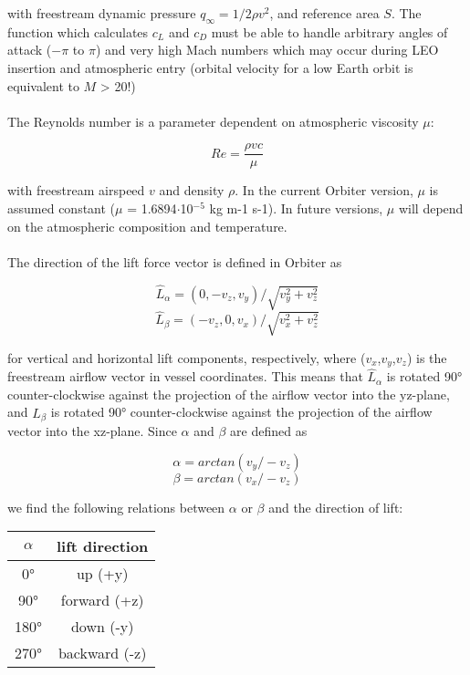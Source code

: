 \documentclass[Orbiter Developer Manual.tex]{subfiles}
\begin{document}
\noindent
with freestream dynamic pressure $q_{\infty} = 1/2\rho v^{2}$, and reference area $S$. The function which calculates $c_{L}$ and $c_{D}$ must be able to handle arbitrary angles of attack ($-\pi$ to $\pi$) and very high Mach numbers which may occur during LEO insertion and atmospheric entry (orbital velocity for a low Earth orbit is equivalent to $M$ > 20!)\\
\\
The Reynolds number is a parameter dependent on atmospheric viscosity $\mu$:

\[ Re = \frac{\rho vc}{\mu} \]

\noindent
with freestream airspeed $v$ and density $\rho$. In the current Orbiter version, $\mu$ is assumed constant ($\mu$ = 1.6894$\cdot$10$^{-5}$ kg m-1 s-1). In future versions, $\mu$ will depend on the atmospheric composition and temperature.\\
\\
The direction of the lift force vector is defined in Orbiter as

\[ \hat{L}_{\alpha} = (0,-v_{z},v_{y}) / \sqrt{v_{y}^{2} + v_{z}^{2}} \]
\[ \hat{L}_{\beta} = (-v_{z},0,v_{x}) / \sqrt{v_{x}^{2} + v_{z}^{2}} \]

\noindent
for vertical and horizontal lift components, respectively, where ($v_{x}$,$v_{y}$,$v_{z}$) is the freestream airflow vector in vessel coordinates. This means that $\hat{L}_{\alpha}$ is rotated 90° counter-clockwise against the projection of the airflow vector into the yz-plane, and $\hat{L}_{\beta}$ is rotated 90° counter-clockwise against the projection of the airflow vector into the xz-plane. Since $\alpha$ and $\beta$ are defined as

\[ \alpha = arctan(v_{y} / -v_{z}) \]
\[ \beta = arctan(v_{x} / -v_{z}) \]

\noindent
we find the following relations between $\alpha$ or $\beta$ and the direction of lift:

\begin{table}[H]
	\centering
	\begin{tabular}{ |c|c| }
	\hline\rule{0pt}{2ex}
	\textbf{$\alpha$} & \textbf{lift direction} \\
	\hline\rule{0pt}{2ex}
	0° & up (+y)\\
	\hline\rule{0pt}{2ex}
	90° & forward (+z)\\
	\hline\rule{0pt}{2ex}
	180° & down (-y)\\
	\hline\rule{0pt}{2ex}
	270° & backward (-z)\\
	\hline
	\end{tabular}
\end{table}
\end{document}
